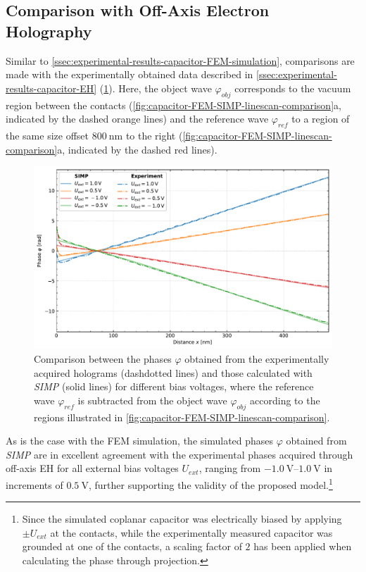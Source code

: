 \subsection{Comparison with Off-Axis Electron Holography} \label{ssec:experimental-results-SIMP-EH-comparison}
Similar to \cref{ssec:experimental-results-capacitor-FEM-simulation}, comparisons are made with the experimentally obtained data described in \cref{ssec:experimental-results-capacitor-EH} (\cref{fig:capacitor-SIMP-EH-linescan-comparison}). Here, the object wave $\varphi_{\mathit{obj}}$ corresponds to the vacuum region between the contacts (\cref{fig:capacitor-FEM-SIMP-linescan-comparison}a, indicated by the dashed orange lines) and the reference wave $\varphi_{\mathit{ref}}$ to a region of the same size offset $\SI{800}{\nm}$ to the right (\cref{fig:capacitor-FEM-SIMP-linescan-comparison}a, indicated by the dashed red lines).
\begin{figure}[H]
	\centering
	\includegraphics[width=\textwidth]{Figures/Results/Capacitor/Simulations/capacitor-SIMP-EH-linescan-comparison.pdf}
	\caption{Comparison between the phases $\varphi$ obtained from the experimentally acquired holograms (dashdotted lines) and those calculated with \emph{SIMP} (solid lines) for different bias voltages, where the reference wave $\varphi_{\mathit{ref}}$ is subtracted from the object wave $\varphi_{\mathit{obj}}$ according to the regions illustrated in \cref{fig:capacitor-FEM-SIMP-linescan-comparison}.}
	\label{fig:capacitor-SIMP-EH-linescan-comparison}
\end{figure}
As is the case with the FEM simulation, the simulated phases $\varphi$ obtained from \emph{SIMP} are in excellent agreement with the experimental phases acquired through off-axis EH for all external bias voltages $U_{\mathit{ext}}$, ranging from $\SIrange{-1.0}{1.0}{\volt}$ in increments of $\SI{0.5}{\volt}$, further supporting the validity of the proposed model.\footnote{Since the simulated coplanar capacitor was electrically biased by applying $\pm U_{\mathit{ext}}$ at the contacts, while the experimentally measured capacitor was grounded at one of the contacts, a scaling factor of $2$ has been applied when calculating the phase through projection.}

